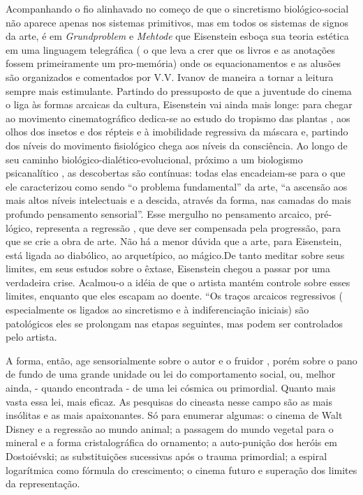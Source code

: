 Acompanhando o fio alinhavado no começo de que o sincretismo
biológico-social não aparece apenas nos sistemas primitivos, mas em
todos os sistemas de signos da arte, é em \emph{Grundproblem} e
\emph{Mehtode} que Eisenstein esboça sua teoria estética em uma
linguagem telegráfica ( o que leva a crer que os livros e as anotações
fossem primeiramente um pro-memória) onde os equacionamentos e as
alusões são organizados e comentados por V.V. Ivanov de maneira a tornar
a leitura sempre mais estimulante. Partindo do pressuposto de que a
juventude do cinema o liga às formas arcaicas da cultura, Eisenstein vai
ainda mais longe: para chegar ao movimento cinematográfico dedica-se ao
estudo do tropismo das plantas , aos olhos dos insetos e dos répteis e à
imobilidade regressiva da máscara e, partindo dos níveis do movimento
fisiológico chega aos níveis da consciência. Ao longo de seu caminho
biológico-dialético-evolucional, próximo a um biologismo psicanalítico ,
as descobertas são contínuas: todas elas encadeiam-se para o que ele
caracterizou como sendo ``o problema fundamental'' da arte, ``a ascensão
aos mais altos níveis intelectuais e a descida, através da forma, nas
camadas do mais profundo pensamento sensorial''. Esse mergulho no
pensamento arcaico, pré-lógico, representa a regressão , que deve ser
compensada pela progressão, para que se crie a obra de arte. Não há a
menor dúvida que a arte, para Eisenstein, está ligada ao diabólico, ao
arquetípico, ao mágico.De tanto meditar sobre seus limites, em seus
estudos sobre o êxtase, Eisenstein chegou a passar por uma verdadeira
crise. Acalmou-o a idéia de que o artista mantém controle sobre esses
limites, enquanto que eles escapam ao doente. ``Os traços arcaicos
regressivos ( especialmente os ligados ao sincretismo e à
indiferenciação iniciais) são patológicos eles se prolongam nas etapas
seguintes, mas podem ser controlados pelo artista.

A forma, então, age sensorialmente sobre o autor e o fruidor , porém
sobre o pano de fundo de uma grande unidade ou lei do comportamento
social, ou, melhor ainda, - quando encontrada - de uma lei cósmica ou
primordial. Quanto mais vasta essa lei, mais eficaz. As pesquisas do
cineasta nesse campo são as mais insólitas e as mais apaixonantes. Só
para enumerar algumas: o cinema de Walt Disney e a regressão ao mundo
animal; a passagem do mundo vegetal para o mineral e a forma
cristalográfica do ornamento; a auto-punição dos heróis em Dostoiévski;
as substituições sucessivas após o trauma primordial; a espiral
logarítmica como fórmula do crescimento; o cinema futuro e superação dos
limites da representação.

